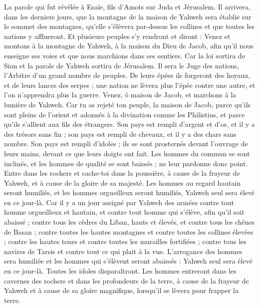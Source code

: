 \begin{multicols}{2}
\VerseOne{}La parole qui fut révélée à Esaïe, fils d'Amots sur Juda et Jérusalem.
Il arrivera, dans les derniers jours, que la montagne de la maison de Yahweh sera établie sur le sommet des montagnes, qu'elle s'élèvera par-dessus les collines et que toutes les nations y afflueront.
Et plusieurs peuples s'y rendront et diront : Venez et montons à la montagne de Yahweh, à la maison du Dieu de Jacob, afin qu'il nous enseigne ses voies et que nous marchions dans ses sentiers. Car la loi sortira de Sion et la parole de Yahweh sortira de Jérusalem.
Il sera le Juge des nations, l'Arbitre d'un grand nombre de peuples. De leurs épées ils forgeront des hoyaux, et de leurs lances des serpes ; une nation ne lèvera plus l'épée contre une autre, et l'on n'apprendra plus la guerre.
Venez, ô maison de Jacob, et marchons à la lumière de Yahweh.
Car tu as rejeté ton peuple, la maison de Jacob, parce qu'ils sont pleins de l'orient et adonnés à la divination comme les Philistins, et parce qu'ils s'allient aux fils des étrangers.
Son pays est rempli d'argent et d'or, et il y a des trésors sans fin ; son pays est rempli de chevaux, et il y a des chars sans nombre.
Son pays est rempli d'idoles ; ils se sont prosternés devant l'ouvrage de leurs mains, devant ce que leurs doigts ont fait.
Les hommes du commun se sont inclinés, et les hommes de qualité se sont baissés ; ne leur pardonne donc point.
Entre dans les rochers et cache-toi dans la poussière, à cause de la frayeur de Yahweh, et à cause de la gloire de sa majesté.
Les hommes au regard hautain seront humiliés, et les hommes orgueilleux seront humiliés, Yahweh seul sera élevé en ce jour-là.
Car il y a un jour assigné par Yahweh des armées contre tout homme orgueilleux et hautain, et contre tout homme qui s'élève, afin qu'il soit abaissé ;
contre tous les cèdres du Liban, hauts et élevés, et contre tous les chênes de Basan ;
contre toutes les hautes montagnes et contre toutes les collines élevées ;
contre les hautes tours et contre toutes les murailles fortifiées ;
contre tous les navires de Tarsis et contre tout ce qui plait à la vue.
L'arrogance des hommes sera humiliée et les hommes qui s'élèvent seront abaissés :
Yahweh seul sera élevé en ce jour-là. Toutes les idoles disparaîtront.
Les hommes entreront dans les cavernes des rochers et dans les profondeurs de la terre, à cause de la frayeur de Yahweh et à cause de sa gloire magnifique, lorsqu'il se lèvera pour frapper la terre.

\end{multicols}
